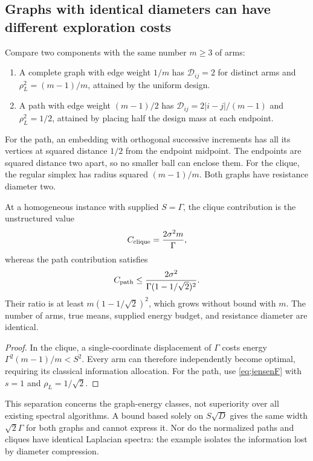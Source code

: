\subsection{Graphs with identical diameters can have different exploration costs}
Compare two components with the same number $m\ge3$ of arms:
\begin{enumerate}
 \item A complete graph with edge weight $1/m$ has $\mathcal D_{ij}=2$ for distinct arms and $\rho_L^2=(m-1)/m$, attained by the uniform design.
 \item A path with edge weight $(m-1)/2$ has $\mathcal D_{ij}=2|i-j|/(m-1)$ and $\rho_L^2=1/2$, attained by placing half the design mass at each endpoint.
\end{enumerate}
For the path, an embedding with orthogonal successive increments has all its vertices at squared distance $1/2$ from the endpoint midpoint. The endpoints are squared distance two apart, so no smaller ball can enclose them. For the clique, the regular simplex has radius squared $(m-1)/m$. Both graphs have resistance diameter two.

\begin{corollary}
At a homogeneous instance with supplied $S=\Gamma$, the clique contribution is the unstructured value
\begin{equation}
 C_{\rm clique}=\frac{2\sigma^2m}{\Gamma},
 \label{eq:cliqueseparation}
\end{equation}
whereas the path contribution satisfies
\begin{equation}
 C_{\rm path}\le
 \frac{2\sigma^2}{\Gamma(1-1/\sqrt2)^2}.
 \label{eq:pathinformation}
\end{equation}
Their ratio is at least $m(1-1/\sqrt2)^2$, which grows without bound with $m$. The number of arms, true means, supplied energy budget, and resistance diameter are identical.
\label{cor:informationseparation}
\end{corollary}
\begin{proof}
In the clique, a single-coordinate displacement of $\Gamma$ costs energy $\Gamma^2(m-1)/m< S^2$. Every arm can therefore independently become optimal, requiring its classical information allocation. For the path, use \eqref{eq:jensenF} with $s=1$ and $\rho_L=1/\sqrt2$.
\end{proof}
This separation concerns the graph-energy classes, not superiority over all existing spectral algorithms. A bound based solely on $S\sqrt D$ gives the same width $\sqrt2\Gamma$ for both graphs and cannot express it. Nor do the normalized paths and cliques have identical Laplacian spectra: the example isolates the information lost by diameter compression.

